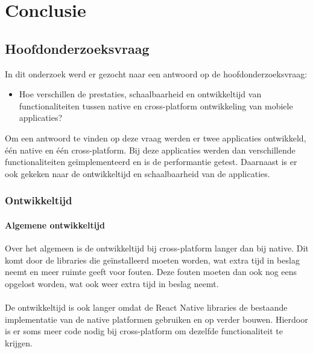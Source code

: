 
\chapter{Conclusie}%
\label{ch:conclusie}

\section{Hoofdonderzoeksvraag}
In dit onderzoek werd er gezocht naar een antwoord op de hoofdonderzoeksvraag:
\begin{itemize}
    \item Hoe verschillen de prestaties, schaalbaarheid en ontwikkeltijd van functionaliteiten tussen native en cross-platform ontwikkeling van mobiele applicaties?
\end{itemize}
Om een antwoord te vinden op deze vraag werden er twee applicaties ontwikkeld, één native en één cross-platform.
Bij deze applicaties werden dan verschillende functionaliteiten geïmplementeerd en is de performantie getest. 
Daarnaast is er ook gekeken naar de ontwikkeltijd en schaalbaarheid van de applicaties. 

\subsection{Ontwikkeltijd}
\subsubsection{Algemene ontwikkeltijd}
Over het algemeen is de ontwikkeltijd bij cross-platform langer dan bij native.
Dit komt door de libraries die geïnstalleerd moeten worden, wat extra tijd in beslag neemt en meer 
ruimte geeft voor fouten. Deze fouten moeten dan ook nog eens opgelost worden, wat ook weer extra tijd in beslag neemt.
\\\\
De ontwikkeltijd is ook langer omdat de React Native libraries de bestaande implementatie van de 
native platformen gebruiken en op verder bouwen. Hierdoor is er soms meer code nodig bij 
cross-platform om dezelfde functionaliteit te krijgen.

